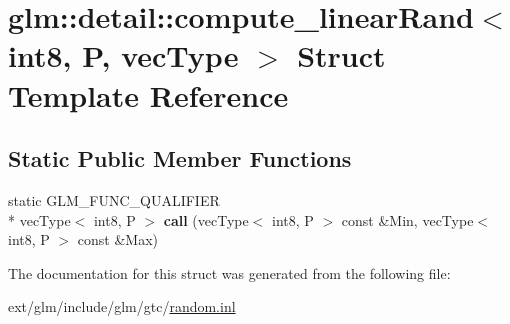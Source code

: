 \hypertarget{structglm_1_1detail_1_1compute__linear_rand_3_01int8_00_01_p_00_01vec_type_01_4}{\section{glm\-:\-:detail\-:\-:compute\-\_\-linear\-Rand$<$ int8, P, vec\-Type $>$ Struct Template Reference}
\label{structglm_1_1detail_1_1compute__linear_rand_3_01int8_00_01_p_00_01vec_type_01_4}
}
\subsection*{Static Public Member Functions}
\begin{DoxyCompactItemize}
\item 
\hypertarget{structglm_1_1detail_1_1compute__linear_rand_3_01int8_00_01_p_00_01vec_type_01_4_a0ce1c78af3d0d236a2bf50646d60bc8b}{static G\-L\-M\-\_\-\-F\-U\-N\-C\-\_\-\-Q\-U\-A\-L\-I\-F\-I\-E\-R \\*
vec\-Type$<$ int8, P $>$ {\bfseries call} (vec\-Type$<$ int8, P $>$ const \&Min, vec\-Type$<$ int8, P $>$ const \&Max)}\label{structglm_1_1detail_1_1compute__linear_rand_3_01int8_00_01_p_00_01vec_type_01_4_a0ce1c78af3d0d236a2bf50646d60bc8b}

\end{DoxyCompactItemize}


The documentation for this struct was generated from the following file\-:\begin{DoxyCompactItemize}
\item 
ext/glm/include/glm/gtc/\hyperlink{random_8inl}{random.\-inl}\end{DoxyCompactItemize}
